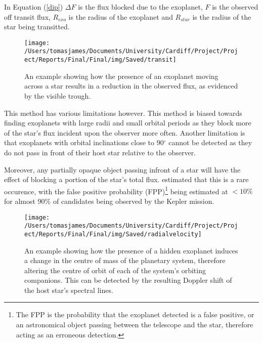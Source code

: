 \documentclass{report}
\begin{document}
In Equation (\ref{dip}) $\Delta F$ is the flux blocked due to the exoplanet, $F$ is the observed off transit flux, $R_{exo}$ is the radius of the exoplanet and $R_{star}$ is the radius of the star being transitted.

\begin{wrapfigure}{r}{0.4\textwidth}
\vspace{-10pt}
\centering
    \texttt{[image: /Users/tomasjames/Documents/University/Cardiff/Project/Project/Reports/Final/Final/img/Saved/transit]}
\caption[An example showing how the presence of an exoplanet moving across a star results in a reduction in the observed flux, as evidenced by the visible trough.]{An example showing how the presence of an exoplanet moving across a star results in a reduction in the observed flux, as evidenced by the visible trough. \parencite{transitimg}}\label{Transit}
\vspace{-10pt}
\end{wrapfigure}

This method has various limitations however. This method is biased towards finding exoplanets with large radii and small orbital periods as they block more of the star$’$s flux incident upon the observer more often. Another limitation is that exoplanets with orbital inclinations close to 90$^\circ$ cannot be detected as they do not pass in front of their host star relative to the observer.

Moreover, any partially opaque object passing infront of a star will have the effect of blocking a portion of the star's total flux. \textcite{false} estimated that this is a rare occurence, with the false positive probability (FPP)\footnote{The FPP is the probability that the exoplanet detected is a false positive, or an astronomical object passing between the telescope and the star, therefore acting as an erroneous detection.} being estimated at $<10\%$ for almost 90\% of candidates being observed by the Kepler mission.

\begin{wrapfigure}{l}{0.4\textwidth}
\vspace{-10pt}
\centering
    \texttt{[image: /Users/tomasjames/Documents/University/Cardiff/Project/Project/Reports/Final/Final/img/Saved/radialvelocity]}
\caption[An example showing how the presence of a hidden exoplanet induces a change in the centre of mass of the planetary system, therefore altering the centre of orbit of each of the system's orbiting companions. This can be detected by the resulting Doppler shift of the host star's spectral lines.] {An example showing how the presence of a hidden exoplanet induces a change in the centre of mass of the planetary system, therefore altering the centre of orbit of each of the system's orbiting companions. This can be detected by the resulting Doppler shift of the host star's spectral lines. \parencite{rvdetect}}\label{rvdetect}
\vspace{-10pt}
\end{wrapfigure}
\end{document}

